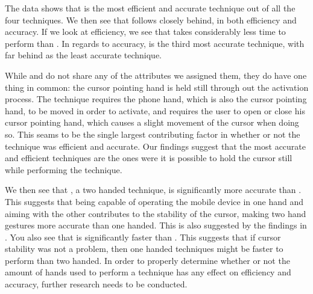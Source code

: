 The data shows that \swipe is the most efficient and accurate technique out of all the four techniques.
We then see that \throw follows closely behind, in both efficiency and accuracy. 
If we look at efficiency, we see that \tilt takes considerably less time to perform than \grab.
In regards to accuracy, \grab is the third most accurate technique, with \tilt far behind as the least accurate technique.

While \swipe and \throw do not share any of the attributes we assigned them, they do have one thing in common: the cursor pointing hand is held still through out the activation process.
The \tilt technique requires the phone hand, which is also the cursor pointing hand, to be moved in order to activate, and \grab requires the user to open or close his cursor pointing hand, which causes a slight movement of the cursor when doing so.
This seams to be the single largest contributing factor in whether or not the technique was efficient and accurate.
Our findings suggest that the most accurate and efficient techniques are the ones were it is possible to hold the cursor still while performing the technique.

We then see that \grab, a two handed technique, is significantly more accurate than \tilt.
This suggests that being capable of operating the mobile device in one hand and aiming with the other contributes to the stability of the cursor, making two hand gestures more accurate than one handed.
This is also suggested by the findings in \cite{Seifert:2013}.
You also see that \tilt is significantly faster than \grab.
This suggests that if cursor stability was not a problem, then one handed techniques might be faster to perform than two handed.
In order to properly determine whether or not the amount of hands used to perform a technique has any effect on efficiency and accuracy, further research needs to be conducted. 


